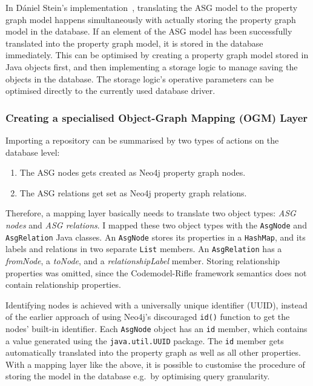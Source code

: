 In Dániel Stein's implementation~\cite{stein-daniel-msc}, translating the ASG model to the property graph model happens simultaneously with actually storing the property graph model in the database. If an element of the ASG model has been successfully translated into the property graph model, it is stored in the database immediately. This can be optimised by creating a property graph model stored in Java objects first, and then implementing a storage logic to manage saving the objects in the database. The storage logic's operative parameters can be optimised directly to the currently used database driver.

\subsubsection{Creating a specialised Object-Graph Mapping (OGM) Layer}

Importing a repository can be summarised by two types of actions on the database level:

\begin{enumerate}
\item The ASG nodes gets created as Neo4j property graph nodes.
\item The ASG relations get set as Neo4j property graph relations.
\end{enumerate}

Therefore, a mapping layer basically needs to translate two object types: \emph{ASG nodes} and \emph{ASG relations}. I mapped these two object types with the \texttt{AsgNode} and \texttt{AsgRelation} Java classes. An \texttt{AsgNode} stores its properties in a \texttt{HashMap}, and its labels and relations in two separate \texttt{List} members. An \texttt{AsgRelation} has a \emph{fromNode}, a \emph{toNode}, and a \emph{relationshipLabel} member. Storing relationship properties was omitted, since the Codemodel-Rifle framework semantics does not contain relationship properties.

Identifying nodes is achieved with a universally unique identifier (UUID), instead of the earlier approach of using Neo4j's discouraged \texttt{id()} function to get the nodes' built-in identifier. Each \texttt{AsgNode} object has an \texttt{id} member, which contains a value generated using the \texttt{java.util.UUID} package. The \texttt{id} member gets automatically translated into the property graph as well as all other properties. With a mapping layer like the above, it is possible to customise the procedure of storing the model in the database e.g.\ by optimising query granularity.


